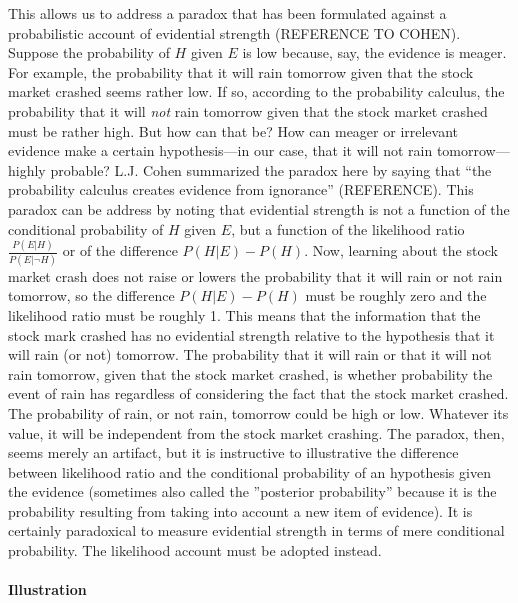 \documentclass[10pt]{article}
\begin{document}
This allows us to address a paradox 
that has been formulated against a probabilistic account of evidential strength (REFERENCE TO COHEN).
Suppose the probability of $H$ given $E$ is low because, say, the evidence is meager. For example, the probability that it will rain tomorrow given that the stock market crashed 
seems rather low. If so, according to the probability calculus, the probability that it will \textit{not} rain tomorrow given that the stock market crashed must be rather high. But how can that be? How can meager or irrelevant evidence make a certain hypothesis---in our case, that it will not rain tomorrow---highly probable? L.J. Cohen summarized the paradox here by saying that ``the probability calculus creates evidence from ignorance'' (REFERENCE). This paradox can be address by noting that evidential strength is not a function of 
the conditional probability of $H$ given $E$, but a function of the likelihood ratio $\frac{P(E | H)}{P(E | \neg H)}$ or of the difference $P(H|E) - P(H)$. Now, learning about the stock market crash does not raise or lowers the probability that it will rain or not rain tomorrow, so the difference $P(H|E) - P(H)$ must be roughly zero and 
the likelihood ratio must be roughly 1. This means that the information that the stock mark crashed 
has no evidential strength relative to the hypothesis that it will rain (or not) tomorrow. 
The probability that it will rain or that it will not rain tomorrow, given that the stock market crashed, is whether 
probability the event of rain has regardless of considering the fact that the stock market crashed. The probability of rain, or not rain, 
tomorrow could be high or low. Whatever its value, it will be independent from the stock market crashing. 
The paradox, then, seems merely an artifact, but it is instructive to illustrative the difference between likelihood ratio and the 
conditional probability of an hypothesis given the evidence (sometimes also called the ''posterior probability'' because it 
is the probability resulting from taking into account a new item of evidence). It is certainly paradoxical to measure evidential strength in terms of mere conditional probability. 
The likelihood account must be adopted instead.


\paragraph{Illustration}
\end{document}
